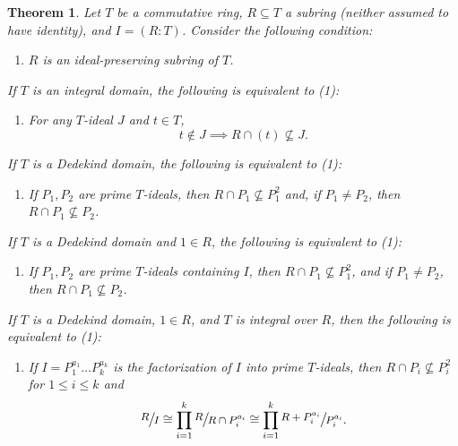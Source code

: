 \documentclass[12pt]{amsart}
\newtheorem{theorem}{Theorem}[section]
\theoremstyle{definition}
\newcommand{\quot}[2]{\large\sfrac{#1}{#2}\normalsize}
\begin{document}
	\begin{theorem}
		\label{ip equiv conditions}
		Let $T$ be a commutative ring, $R\subseteq T$ a subring (neither assumed to have identity), and $I=(R:T)$. Consider the following condition:
		\begin{enumerate}
			\item $R$ is an ideal-preserving subring of $T$.
		\end{enumerate}
		If $T$ is an integral domain, the following is equivalent to (1):
		\begin{enumerate}
			\item[(2)] For any $T$-ideal $J$ and $t\in T$, $$t\notin J\implies R\cap (t)\nsubseteq J.$$
		\end{enumerate}
		If $T$ is a Dedekind domain, the following is equivalent to (1):
		\begin{enumerate}
			\item[(3)] If $P_1,P_2$ are prime $T$-ideals, then $R\cap P_1\nsubseteq P_1^2$ and, if $P_1\neq P_2$, then $R\cap P_1\nsubseteq P_2$.
		\end{enumerate}
		If $T$ is a Dedekind domain and $1\in R$, the following is equivalent to (1):
		\begin{enumerate}
			\item[(4)] If $P_1,P_2$ are prime $T$-ideals containing $I$, then $R\cap P_1\nsubseteq P_1^2$, and if $P_1\neq P_2$, then $R\cap P_1\nsubseteq P_2$.
		\end{enumerate}
		If $T$ is a Dedekind domain, $1\in R$, and $T$ is integral over $R$, then the following is equivalent to (1):
		\begin{enumerate}
			\item[(5)] If $I=P_1^{a_1}\dots P_k^{a_k}$ is the factorization of $I$ into prime $T$-ideals, then $R\cap P_i\nsubseteq P_i^2$ for $1\leq i\leq k$ and 
			$$\quot{R}{I}\cong \prod_{i=1}^k\quot{R}{R\cap P_i^{a_i}}\cong \prod_{i=1}^k\quot{R+P_i^{a_i}}{P_i^{a_i}}.$$
		\end{enumerate}
	\end{theorem}
	
\end{document}
